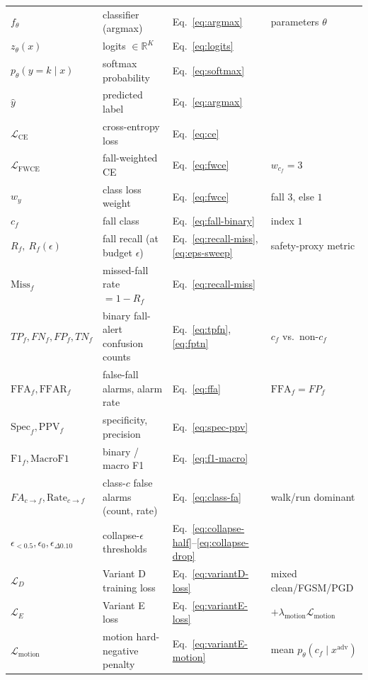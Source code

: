 \begin{table}[t]
\begin{tabular}{l l l l}
    $f_\theta$ & classifier (argmax) & Eq.~\ref{eq:argmax} & parameters $\theta$ \\
    $z_\theta(x)$ & logits $\in\mathbb{R}^{K}$ & Eq.~\ref{eq:logits} & \\
    $p_\theta(y{=}k\mid x)$ & softmax probability & Eq.~\ref{eq:softmax} & \\
    $\hat{y}$ & predicted label & Eq.~\ref{eq:argmax} & \\
    $\mathcal{L}_{\mathrm{CE}}$ & cross-entropy loss & Eq.~\ref{eq:ce} & \\
    $\mathcal{L}_{\mathrm{FWCE}}$ & fall-weighted CE & Eq.~\ref{eq:fwce} & $w_{c_f}=3$ \\
    $w_y$ & class loss weight & Eq.~\ref{eq:fwce} & fall $3$, else $1$ \\
    $c_f$ & fall class & Eq.~\ref{eq:fall-binary} & index $1$ \\
    $R_f,\ R_f(\epsilon)$ & fall recall (at budget $\epsilon$) & Eq.~\ref{eq:recall-miss},\ref{eq:eps-sweep} & safety-proxy metric \\
    $\mathrm{Miss}_f$ & missed-fall rate $=1-R_f$ & Eq.~\ref{eq:recall-miss} & \\
    $TP_f,FN_f,FP_f,TN_f$ & binary fall-alert confusion counts & Eq.~\ref{eq:tpfn},\ref{eq:fptn} & $c_f$ vs.\ non-$c_f$ \\
    $\mathrm{FFA}_f,\mathrm{FFAR}_f$ & false-fall alarms, alarm rate & Eq.~\ref{eq:ffa} & $\mathrm{FFA}_f=FP_f$ \\
    $\mathrm{Spec}_f,\mathrm{PPV}_f$ & specificity, precision & Eq.~\ref{eq:spec-ppv} & \\
    $\mathrm{F1}_f,\mathrm{MacroF1}$ & binary / macro F1 & Eq.~\ref{eq:f1-macro} & \\
    $FA_{c\to f},\mathrm{Rate}_{c\to f}$ & class-$c$ false alarms (count, rate) & Eq.~\ref{eq:class-fa} & walk/run dominant \\
    $\epsilon_{<0.5},\epsilon_0,\epsilon_{\Delta0.10}$ & collapse-$\epsilon$ thresholds & Eq.~\ref{eq:collapse-half}--\ref{eq:collapse-drop} & \\
    $\mathcal{L}_{D}$ & Variant D training loss & Eq.~\ref{eq:variantD-loss} & mixed clean/FGSM/PGD \\
    $\mathcal{L}_{E}$ & Variant E loss & Eq.~\ref{eq:variantE-loss} & $+\lambda_{\mathrm{motion}}\mathcal{L}_{\mathrm{motion}}$ \\
    $\mathcal{L}_{\mathrm{motion}}$ & motion hard-negative penalty & Eq.~\ref{eq:variantE-motion} & mean $p_\theta(c_f\mid x^{\mathrm{adv}})$ \\

\end{tabular}
\end{table}

